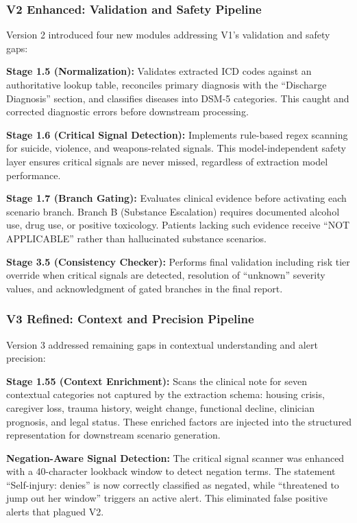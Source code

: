 \documentclass[conference]{IEEEtran}
\begin{document}
\subsubsection{V2 Enhanced: Validation and Safety Pipeline}

Version 2 introduced four new modules addressing V1's validation and safety gaps:

\textbf{Stage 1.5 (Normalization):} Validates extracted ICD codes against an authoritative lookup table, reconciles primary diagnosis with the ``Discharge Diagnosis'' section, and classifies diseases into DSM-5 categories. This caught and corrected diagnostic errors before downstream processing.

\textbf{Stage 1.6 (Critical Signal Detection):} Implements rule-based regex scanning for suicide, violence, and weapons-related signals. This model-independent safety layer ensures critical signals are never missed, regardless of extraction model performance.

\textbf{Stage 1.7 (Branch Gating):} Evaluates clinical evidence before activating each scenario branch. Branch B (Substance Escalation) requires documented alcohol use, drug use, or positive toxicology. Patients lacking such evidence receive ``NOT APPLICABLE'' rather than hallucinated substance scenarios.

\textbf{Stage 3.5 (Consistency Checker):} Performs final validation including risk tier override when critical signals are detected, resolution of ``unknown'' severity values, and acknowledgment of gated branches in the final report.

\subsubsection{V3 Refined: Context and Precision Pipeline}

Version 3 addressed remaining gaps in contextual understanding and alert precision:

\textbf{Stage 1.55 (Context Enrichment):} Scans the clinical note for seven contextual categories not captured by the extraction schema: housing crisis, caregiver loss, trauma history, weight change, functional decline, clinician prognosis, and legal status. These enriched factors are injected into the structured representation for downstream scenario generation.

\textbf{Negation-Aware Signal Detection:} The critical signal scanner was enhanced with a 40-character lookback window to detect negation terms. The statement ``Self-injury: denies'' is now correctly classified as negated, while ``threatened to jump out her window'' triggers an active alert. This eliminated false positive alerts that plagued V2.
\end{document}
